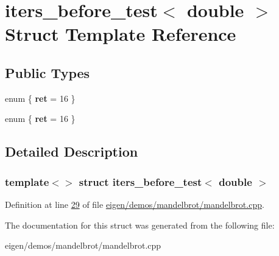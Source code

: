 \hypertarget{structiters__before__test_3_01double_01_4}{}\section{iters\+\_\+before\+\_\+test$<$ double $>$ Struct Template Reference}
\label{structiters__before__test_3_01double_01_4}
\subsection*{Public Types}
\begin{DoxyCompactItemize}
\item 
\mbox{\label{structiters__before__test_3_01double_01_4_a42eb3aaa0a810dc09b1f07cbea0053ea}} 
enum \{ {\bfseries ret} = 16
 \}
\item 
\mbox{\label{structiters__before__test_3_01double_01_4_a42454ee2704889b5da1c7448b7d50cd0}} 
enum \{ {\bfseries ret} = 16
 \}
\end{DoxyCompactItemize}


\subsection{Detailed Description}
\subsubsection*{template$<$$>$\newline
struct iters\+\_\+before\+\_\+test$<$ double $>$}



Definition at line \hyperlink{eigen_2demos_2mandelbrot_2mandelbrot_8cpp_source_l00029}{29} of file \hyperlink{eigen_2demos_2mandelbrot_2mandelbrot_8cpp_source}{eigen/demos/mandelbrot/mandelbrot.\+cpp}.



The documentation for this struct was generated from the following file\+:\begin{DoxyCompactItemize}
\item 
eigen/demos/mandelbrot/mandelbrot.\+cpp\end{DoxyCompactItemize}
